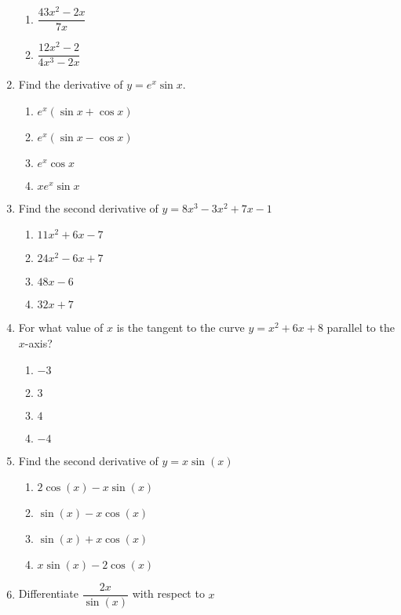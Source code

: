 \begin{multicols}{2}
\begin{enumerate}[label={\arabic*.}]
\begin{enumerate}[label={\Alph*.}]
        \item \(\dfrac{43{x}^{2}-2x}{7x}\)
        \item \(\dfrac{12{x}^{2}-2}{4{x}^{3}-2x}\)
      \end{enumerate}
    \item Find the derivative of \(y = e^{x} \sin x\).
      \begin{enumerate}[label={\Alph*.}]
        \item \(e^x (\sin x + \cos x)\)
        \item \(e^x (\sin x - \cos x)\)
        \item \(e^x \cos x\)
        \item \(x e^x \sin x\)
      \end{enumerate}
    \item Find the second derivative of \(y = 8{x}^{3} - 3{x}^{2} + 7x - 1\)
      \begin{enumerate}[label={\Alph*.}]
        \item \(11{x}^{2} + 6x - 7\)
        \item \(24{x}^{2} - 6x + 7\)
        \item \(48x - 6\)
        \item \(32x + 7\)
      \end{enumerate}
    \item For what value of \(x\) is the tangent to the curve \(y = x^{2} + 6x + 8\) parallel to the \(x\)-axis?
      \begin{enumerate}[label={\Alph*.}]
        \item \(-3\)
        \item \(3\)
        \item \(4\)
        \item \(-4\)
      \end{enumerate}
    \item Find the second derivative of \(y = x\sin(x)\)
      \begin{enumerate}[label={\Alph*.}]
        \item \(2\cos(x) - x \sin(x)\)
        \item \(\sin(x) - x \cos(x)\)
        \item \(\sin(x) + x \cos(x)\)
        \item \(x\sin(x)- 2 \cos(x)\)
      \end{enumerate}
    \item Differentiate \(\dfrac{2x}{\sin(x)}\) with respect to \(x\)
      \begin{enumerate}[label={\Alph*.}]

\end{enumerate}
\end{enumerate}
\end{multicols}
